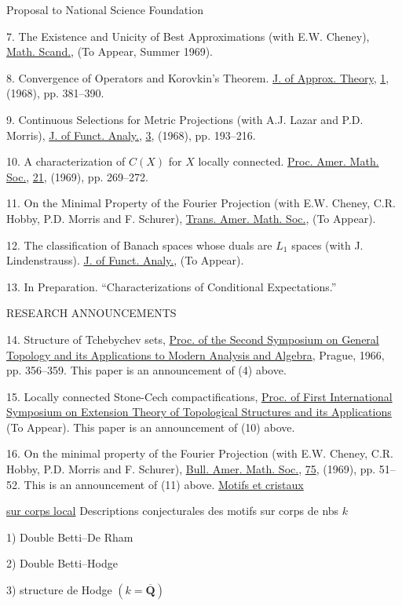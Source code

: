 Proposal to National Science Foundation

7. The Existence and Unicity of Best Approximations (with E.W. Cheney),
\uline{Math. Scand.}, (To Appear, Summer 1969).

8. Convergence of Operators and Korovkin’s Theorem.
\uline{J. of Approx. Theory}, \uline{1}, (1968), pp. 381--390.

9. Continuous Selections for Metric Projections (with A.J. Lazar and P.D. Morris),
\uline{J. of Funct. Analy.}, \uline{3}, (1968), pp. 193--216.

10. A characterization of $C(X)$ for $X$ locally connected.
\uline{Proc. Amer. Math. Soc.}, \uline{21}, (1969), pp. 269--272.

11. On the Minimal Property of the Fourier Projection
(with E.W. Cheney, C.R. Hobby, P.D. Morris and F. Schurer),
\uline{Trans. Amer. Math. Soc.}, (To Appear).

12. The classification of Banach spaces whose duals are $L_1$ spaces
(with J. Lindenstrauss). \uline{J. of Funct. Analy.}, (To Appear).

13. In Preparation. ``Characterizations of Conditional Expectations.''

RESEARCH ANNOUNCEMENTS

14. Structure of Tchebychev sets,
\uline{Proc. of the Second Symposium on General Topology and its Applications to Modern Analysis and Algebra},
Prague, 1966, pp. 356--359. This paper is an announcement of (4) above.

15. Locally connected Stone-Cech compactifications,
\uline{Proc. of First International Symposium on Extension Theory of Topological Structures and its Applications}
(To Appear). This paper is an announcement of (10) above.

16. On the minimal property of the Fourier Projection
(with E.W. Cheney, C.R. Hobby, P.D. Morris and F. Schurer),
\uline{Bull. Amer. Math. Soc.}, \uline{75}, (1969), pp. 51--52.
This is an announcement of (11) above.
\uline{Motifs et cristaux}

\uline{sur corps local}
Descriptions conjecturales des motifs sur corps de nbs  $k$

1) Double  Betti--De Rham

2) Double  Betti--Hodge

3)  structure de Hodge $(k=\overline{\mathbf Q})$

